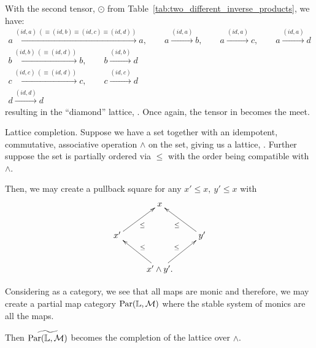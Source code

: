With the second tensor, $\odot$ from Table~\ref{tab:two_different_inverse_products}, we have:
\begin{align*}
  a \xrightarrow{(id,a) \ (\equiv (id, b) \equiv (id,c) \equiv (id,d))} a, \qquad
    a \xrightarrow{(id,a)} b, \qquad a \xrightarrow{(id, a)} c , \qquad a \xrightarrow{(id, a)} d \\
  b \xrightarrow{(id,b) \ (\equiv (id, d))} b ,  \qquad b \xrightarrow{(id,b)} d\\
  c \xrightarrow{(id, c) \ (\equiv (id, d))} c,   \qquad c \xrightarrow{(id,c)} d\\
  d \xrightarrow{(id,d)} d
\end{align*}
resulting in the ``diamond'' lattice, . Once again, the tensor in \D becomes the meet.

\begin{example}{Lattice completion.}\label{example:lattice_completion}
  Suppose we have a set together with an idempotent, commutative, associative operation $\wedge$ on
  the set, giving us a lattice, \Lat. Further suppose the set is partially ordered via $\le$ with
  the order being compatible with $\wedge$.

  Then, we may create a pullback square for any $x' \le x,\ y' \le x$ with
  \[
    \xymatrix{
      &x\\
      x' \ar[ur]_{\le} & & y' \ar[ul]^{\le}\\
      &x'\wedge y'.  \ar[ul]_{\le} \ar[ur]^{\le}
    }
  \]

  Considering \Lat as a category, we see that all maps are monic and therefore, we may create a
  partial map category $\text{Par}(\mathbb{L},\mathcal{M})$ where the stable system of monics are all the maps.

  Then $\widetilde{\text{Par}(\mathbb{L},\mathcal{M})}$ becomes the completion of the lattice over $\wedge$.
\end{example}


